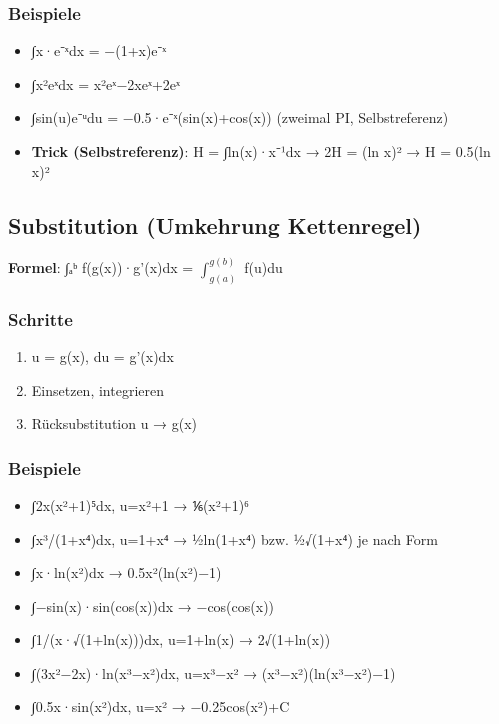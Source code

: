 \documentclass[11pt, a4paper]{article}
\begin{document}
\subsubsection{Beispiele}
\begin{itemize}
  \item ∫x·e⁻ˣdx = −(1+x)e⁻ˣ
  \item ∫x²eˣdx = x²eˣ−2xeˣ+2eˣ
  \item ∫sin(u)e⁻ᵘdu = −0.5·e⁻ˣ(sin(x)+cos(x)) (zweimal PI, Selbstreferenz)
  \item \textbf{Trick (Selbstreferenz)}: H = ∫ln(x)·x⁻¹dx → 2H = (ln x)² → H = 0.5(ln x)²
\end{itemize}


\subsection{Substitution (Umkehrung Kettenregel)}
\textbf{Formel}: ∫ₐᵇ f(g(x))·g'(x)dx = $\int_{g(a)}^{g(b)}$ f(u)du



\subsubsection{Schritte}
\begin{enumerate}
  \item u = g(x), du = g'(x)dx
  \item Einsetzen, integrieren
  \item Rücksubstitution u → g(x)
\end{enumerate}


\subsubsection{Beispiele}
\begin{itemize}
  \item ∫2x(x²+1)⁵dx, u=x²+1 → ⅙(x²+1)⁶
  \item ∫x³/(1+x⁴)dx, u=1+x⁴ → ½ln(1+x⁴) bzw. ½√(1+x⁴) je nach Form
  \item ∫x·ln(x²)dx → 0.5x²(ln(x²)−1)
  \item ∫−sin(x)·sin(cos(x))dx → −cos(cos(x))
  \item ∫1/(x·√(1+ln(x)))dx, u=1+ln(x) → 2√(1+ln(x))
  \item ∫(3x²−2x)·ln(x³−x²)dx, u=x³−x² → (x³−x²)(ln(x³−x²)−1)
  \item ∫0.5x·sin(x²)dx, u=x² → −0.25cos(x²)+C
\end{itemize}
\end{document}
